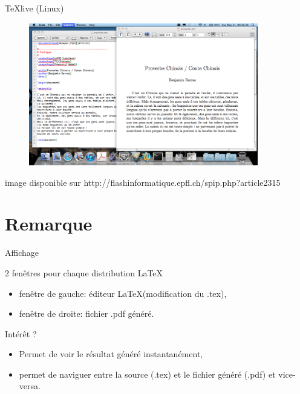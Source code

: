 \documentclass{beamer}
\begin{document}

\begin{frame}{TeXlive (Linux)}

\begin{figure} %
\centering %
\includegraphics[width=10cm]{img/texlive_1} %
\end{figure} %

{\footnotesize image disponible sur http://flashinformatique.epfl.ch/spip.php?article2315}

\end{frame}


\section{Remarque} 


\begin{frame}{Affichage}

2 fenêtres pour chaque distribution  \LaTeX
    \begin{itemize}
        \item fenêtre de gauche: éditeur \LaTeX (modification du .tex),
        \item fenêtre de droite: fichier .pdf généré.
    \end{itemize}


Intérêt ?
    \begin{itemize}
        \item Permet de voir le résultat généré instantanément, 
        \item permet de naviguer entre la source (.tex) et le fichier généré (.pdf) et vice-versa. 
    \end{itemize}

\end{frame}
\end{document}
